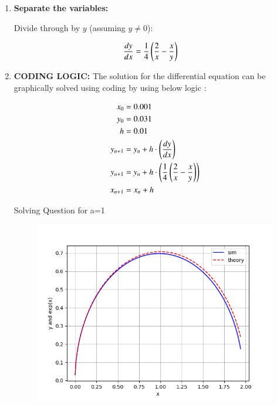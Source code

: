 \documentclass[journal]{IEEEtran}
\numberwithin{equation}{enumi}
\numberwithin{figure}{enumi}
\begin{document}
\begin{enumerate}
\begin{enumerate}
\item \textbf{Separate the variables:}

Divide through by $y$ (assuming \(y \neq 0\)):

\begin{align}
\frac{dy}{dx} &= \frac{1}{4}\left(\frac{2}{x} - \frac{x}{y}\right)
\end{align}



\item \textbf{CODING LOGIC:} The solution for the differential equation can be graphically solved using coding by using below logic :

\begin{align} 
	x_0 &= 0.001 \\ 
	y_0 &= 0.031 \\
	h&=0.01 \\
	y_{n+1} &= y_{n} + h\cdot\left(\frac{dy}{dx}\right) \\ 
	y_{n+1} &= y_{n} + h\cdot\left(\frac{1}{4}\left(\frac{2}{x} - \frac{x}{y}\right)\right) \\ 
	x_{n+1} &= x_{n} + h 
\end{align}

Solving Question for a=1


\begin{figure}[h!]
   \centering
   \includegraphics[width=0.7\linewidth]{figs/Figure_1.png}
\end{figure}
\end{enumerate}
\end{enumerate}
\end{document}
